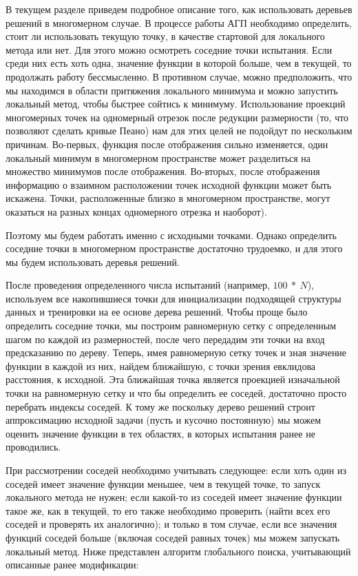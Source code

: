 \documentclass[12pt, a4paper, russian]{article}
\begin{document}
В текущем разделе приведем подробное описание того, как использовать деревьев решений в многомерном случае. В процессе работы АГП необходимо определить, стоит ли использовать текущую точку, в качестве стартовой для локального метода или нет. Для этого можно осмотреть соседние точки испытания. Если среди них есть хоть одна, значение функции в которой больше, чем в текущей, то продолжать работу бессмысленно. В противном случае, можно предположить, что мы находимся в области притяжения локального минимума и можно запустить локальный метод, чтобы быстрее сойтись к минимуму. Использование проекций многомерных точек на одномерный отрезок после редукции размерности (то, что позволяют сделать кривые Пеано) нам для этих целей не подойдут по нескольким причинам. Во-первых, функция после отображения сильно изменяется, один локальный минимум в многомерном пространстве может разделиться на множество минимумов после отображения. Во-вторых, после отображения информацию о взаимном расположении точек исходной функции может быть искажена. Точки, расположенные близко в многомерном пространстве, могут оказаться на разных концах одномерного отрезка и наоборот).




Поэтому мы будем работать именно с исходными точками. Однако определить соседние точки в многомерном пространстве достаточно трудоемко, и для этого мы будем использовать деревья решений. 

После проведения определенного числа испытаний (например, $100\ \ast\ N$), используем все накопившиеся точки для инициализации подходящей структуры данных и тренировки на ее основе дерева решений. Чтобы проще было определить соседние точки, мы построим равномерную сетку с определенным шагом по каждой из размерностей, после чего передадим эти точки на вход предсказанию по дереву. Теперь, имея равномерную сетку точек и зная значение функции в каждой из них, найдем ближайшую, с точки зрения евклидова расстояния, к исходной. Эта ближайшая точка является проекцией изначальной точки на равномерную сетку и что бы определить  ее соседей, достаточно  просто перебрать индексы соседей. К тому же поскольку дерево решений строит аппроксимацию исходной задачи (пусть и кусочно постоянную) мы можем оценить значение функции в тех областях, в которых испытания ранее не проводились.

При рассмотрении соседей необходимо учитывать следующее: если хоть один из соседей имеет значение функции меньшее, чем в текущей точке, то запуск локального метода не нужен; если какой-то из соседей имеет значение функции такое же, как в текущей, то его также необходимо проверить (найти всех его соседей и проверять их аналогично); и только в том случае, если все значения функций соседей больше (включая соседей равных точек) мы можем запускать локальный метод. Ниже представлен алгоритм глобального поиска, учитывающий описанные ранее модификации:
\end{document}
